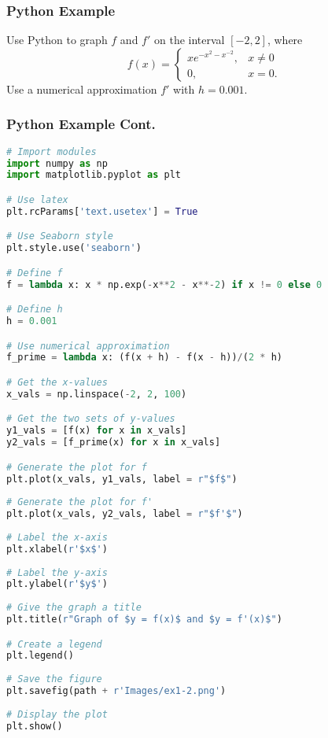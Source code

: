 \documentclass{beamer}
\begin{document}
\begin{frame}[t]
\frametitle{Python Example}
\begin{Example}
Use Python to graph $f$ and $f'$ on the interval $[-2, 2]$, where
$$
f(x) = \begin{cases} x e^{-x^2 - x^{-2}}, & x \neq 0\\ 0,	& x= 0.\end{cases}
$$
Use a numerical approximation $f'$ with $h = 0.001$.
\end{Example}
\end{frame}

\begin{frame}[fragile]
\frametitle{Python Example Cont.}

\begin{multicols}{2}
\begin{lstlisting}[language=Python]
# Import modules 
import numpy as np
import matplotlib.pyplot as plt

# Use latex
plt.rcParams['text.usetex'] = True

# Use Seaborn style
plt.style.use('seaborn')

# Define f
f = lambda x: x * np.exp(-x**2 - x**-2) if x != 0 else 0

# Define h
h = 0.001

# Use numerical approximation
f_prime = lambda x: (f(x + h) - f(x - h))/(2 * h)

# Get the x-values
x_vals = np.linspace(-2, 2, 100)

# Get the two sets of y-values
y1_vals = [f(x) for x in x_vals]
y2_vals = [f_prime(x) for x in x_vals]

# Generate the plot for f
plt.plot(x_vals, y1_vals, label = r"$f$")
         
# Generate the plot for f'
plt.plot(x_vals, y2_vals, label = r"$f'$")  
         
# Label the x-axis
plt.xlabel(r'$x$')
         
# Label the y-axis
plt.ylabel(r'$y$')
         
# Give the graph a title
plt.title(r"Graph of $y = f(x)$ and $y = f'(x)$")

# Create a legend
plt.legend()
         
# Save the figure
plt.savefig(path + r'Images/ex1-2.png')
         
# Display the plot
plt.show()    
\end{lstlisting}
\end{multicols}
\end{frame}
\end{document}
